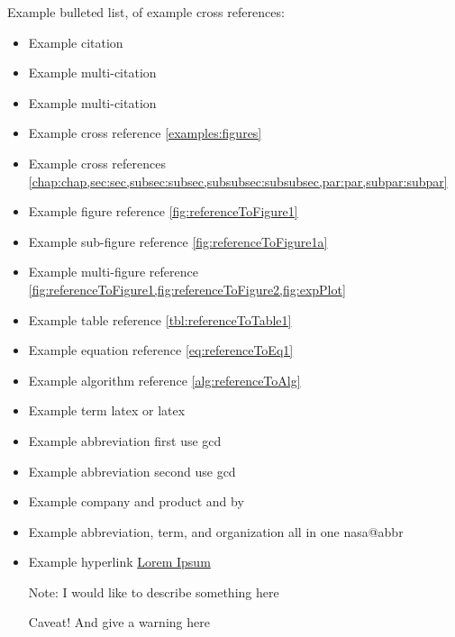 Example bulleted list, of example cross references:
\begin{itemize}
    \item Example citation \cite{smit54}
    \item Example multi-citation \cite{smit54,colu92}
    \item Example multi-citation \cite{smit54,colu92,gree00}
    \item Example cross reference \cref{examples:figures}
    \item Example cross references \cref{chap:chap,sec:sec,subsec:subsec,subsubsec:subsubsec,par:par,subpar:subpar}
    \item Example figure reference \cref{fig:referenceToFigure1}
    \item Example sub-figure reference \cref{fig:referenceToFigure1a}
    \item Example multi-figure reference \cref{fig:referenceToFigure1,fig:referenceToFigure2,fig:expPlot}
    \item Example table reference \cref{tbl:referenceToTable1}
    \item Example equation reference \cref{eq:referenceToEq1}
    \item Example algorithm reference \cref{alg:referenceToAlg}
    \item Example term \gls{latex} or \Gls{latex}
    \item Example abbreviation first use \gls{gcd}
    \item Example abbreviation second use \gls{gcd}
    \item Example company and product  and  by  
    \item Example abbreviation, term, and organization all in one \gls{nasa@abbr}
    \item Example hyperlink \href{https://www.lipsum.com/}{Lorem Ipsum}
    \item[Note:] I would like to describe something here
    \item[Caveat!] And give a warning here
\end{itemize} ~


